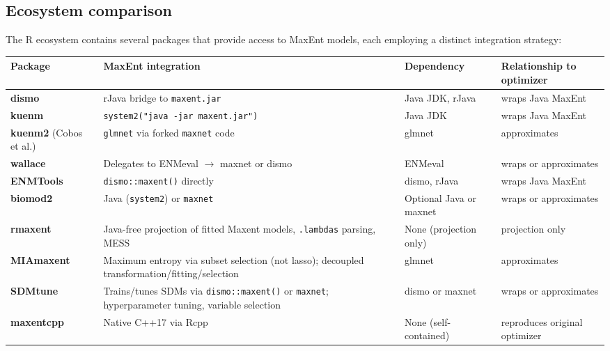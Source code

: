 \documentclass[10pt,letterpaper]{article}
\begin{document}
\subsection*{Ecosystem comparison}

The R ecosystem contains several packages that provide access to MaxEnt
models, each employing a distinct integration strategy:

\begin{longtable}[]{@{}
  >{\raggedright\arraybackslash}p{}
  >{\raggedright\arraybackslash}p{}
  >{\raggedright\arraybackslash}p{}
  >{\raggedright\arraybackslash}p{}@{}}
\toprule\noalign{}
\begin{minipage}[b]{\linewidth}\raggedright
Package
\end{minipage} & \begin{minipage}[b]{\linewidth}\raggedright
MaxEnt integration
\end{minipage} & \begin{minipage}[b]{\linewidth}\raggedright
Dependency
\end{minipage} & \begin{minipage}[b]{\linewidth}\raggedright
Relationship to optimizer
\end{minipage} \\
\midrule\noalign{}
\endhead
\bottomrule\noalign{}
\endlastfoot
\textbf{dismo} \cite{Hijmans2023} & rJava bridge to \texttt{maxent.jar}
& Java JDK, rJava & wraps Java MaxEnt \\
\textbf{kuenm} \cite{Cobos2019} &
\texttt{system2("java\ -jar\ maxent.jar")} & Java JDK & wraps Java
MaxEnt \\
\textbf{kuenm2} (Cobos et al.) & \texttt{glmnet} via forked
\texttt{maxnet} code & glmnet & approximates \\
\textbf{wallace} \cite{Kass2018wallace} & Delegates to ENMeval \(\to\)
maxnet or dismo & ENMeval & wraps or approximates \\
\textbf{ENMTools} \cite{Warren2010} & \texttt{dismo::maxent()} directly
& dismo, rJava & wraps Java MaxEnt \\
\textbf{biomod2} \cite{Thuiller2009} & Java (\texttt{system2}) or
\texttt{maxnet} & Optional Java or maxnet & wraps or approximates \\
\textbf{rmaxent} \cite{Baumgartner2017} & Java-free projection of
fitted Maxent models, \texttt{.lambdas} parsing, MESS & None (projection
only) & projection only \\
\textbf{MIAmaxent} \cite{Vollering2019} & Maximum entropy via subset
selection (not lasso); decoupled transformation/fitting/selection &
glmnet & approximates \\
\textbf{SDMtune} \cite{Vignali2020} & Trains/tunes SDMs via
\texttt{dismo::maxent()} or \texttt{maxnet}; hyperparameter tuning,
variable selection & dismo or maxnet & wraps or approximates \\
\textbf{maxentcpp} & Native C++17 via Rcpp & None (self-contained) &
reproduces original optimizer \\
\end{longtable}
\end{document}
